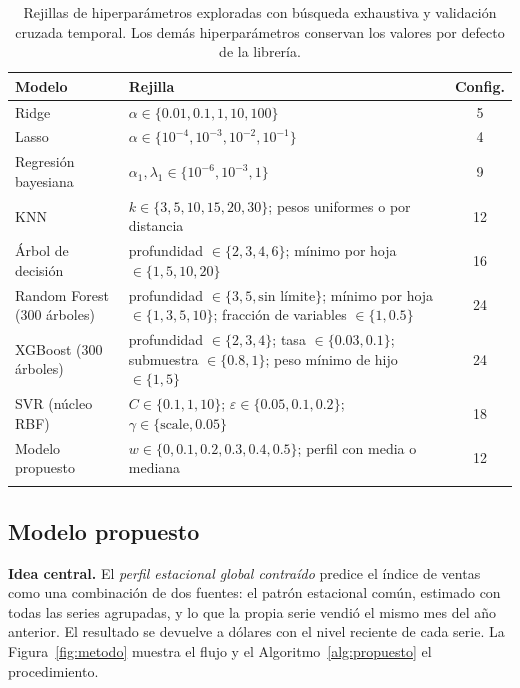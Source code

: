 \documentclass[pdflatex,sn-mathphys-num]{sn-jnl}
\begin{document}
\begin{table}[!htb]
\caption{Rejillas de hiperparámetros exploradas con búsqueda exhaustiva y validación cruzada temporal. Los demás hiperparámetros conservan los valores por defecto de la librería.}\label{tab:rejillas}
\footnotesize
\begin{tabular*}{\textwidth}{@{\extracolsep\fill}p{}p{}c}
\toprule
Modelo & Rejilla & Config. \\
\midrule
Ridge & $\alpha\in\{0.01, 0.1, 1, 10, 100\}$ & 5 \\
Lasso & $\alpha\in\{10^{-4}, 10^{-3}, 10^{-2}, 10^{-1}\}$ & 4 \\
Regresión bayesiana & $\alpha_1,\lambda_1\in\{10^{-6}, 10^{-3}, 1\}$ & 9 \\
KNN & $k\in\{3, 5, 10, 15, 20, 30\}$; pesos uniformes o por distancia & 12 \\
Árbol de decisión & profundidad $\in\{2, 3, 4, 6\}$; mínimo por hoja $\in\{1, 5, 10, 20\}$ & 16 \\
Random Forest (300 árboles) & profundidad $\in\{3, 5, \text{sin límite}\}$; mínimo por hoja $\in\{1, 3, 5, 10\}$; fracción de variables $\in\{1, 0.5\}$ & 24 \\
XGBoost (300 árboles) & profundidad $\in\{2, 3, 4\}$; tasa $\in\{0.03, 0.1\}$; submuestra $\in\{0.8, 1\}$; peso mínimo de hijo $\in\{1, 5\}$ & 24 \\
SVR (núcleo RBF) & $C\in\{0.1, 1, 10\}$; $\varepsilon\in\{0.05, 0.1, 0.2\}$; $\gamma\in\{\text{scale}, 0.05\}$ & 18 \\
Modelo propuesto & $w\in\{0, 0.1, 0.2, 0.3, 0.4, 0.5\}$; perfil con media o mediana & 12 \\
\botrule
\end{tabular*}
\end{table}

\subsection{Modelo propuesto}\label{subsec:propuesto}

\textbf{Idea central.} El \emph{perfil estacional global contraído} predice el índice de ventas como una combinación de dos fuentes: el patrón estacional común, estimado con todas las series agrupadas, y lo que la propia serie vendió el mismo mes del año anterior. El resultado se devuelve a dólares con el nivel reciente de cada serie. La Figura~\ref{fig:metodo} muestra el flujo y el Algoritmo~\ref{alg:propuesto} el procedimiento.
\end{document}
